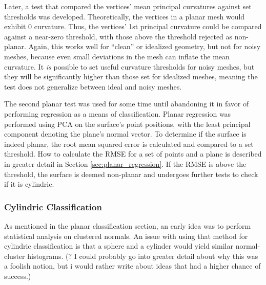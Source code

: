Later, a test that compared the vertices' mean principal curvatures against set thresholds was developed.
Theoretically, the vertices in a planar mesh would exhibit 0 curvature.
Thus, the vertices' 1st principal curvature could be compared against a near-zero threshold, with those above the threshold rejected as non-planar.
Again, this works well for ``clean'' or idealized geometry, but not for noisy meshes, because even small deviations in the mesh can inflate the mean curvature.
It \textit{is} possible to set useful curvature thresholds for noisy meshes, but they will be significantly higher than those set for idealized meshes, meaning the test does not generalize between ideal and noisy meshes.

The second planar test was used for some time until abandoning it in favor of performing regression as a means of classification.
Planar regression was performed using PCA on the surface's point positions, with the least principal component denoting the plane's normal vector.
To determine if the surface is indeed planar, the root mean squared error is calculated and compared to a set threshold.
How to calculate the RMSE for a set of points and a plane is described in greater detail in Section \ref{sec:planar_regression}.
If the RMSE is above the threshold, the surface is deemed non-planar and undergoes further tests to check if it is cylindric.

\subsubsection{Cylindric Classification}

As mentioned in the planar classification section, an early idea was to perform statistical analysis on clustered normals.
An issue with using that method for cylindric classification is that a sphere and a cylinder would yield similar normal-cluster histograms.
(? I could probably go into greater detail about why this was a foolish notion, but i would rather write about ideas that had a higher chance of success.)

